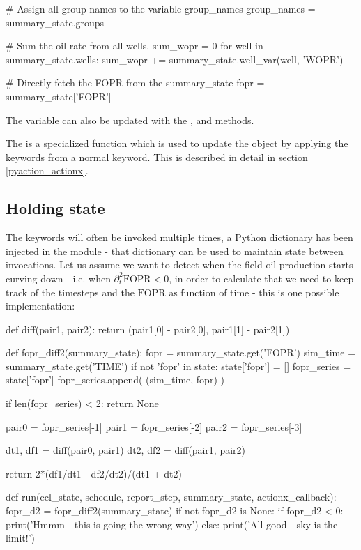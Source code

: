 \begin{description}
\begin{code}
    # Assign all group names to the variable group_names
    group_names = summary_state.groups

    # Sum the oil rate from all wells.
    sum_wopr = 0
    for well in summary_state.wells:
        sum_wopr += summary_state.well_var(well, 'WOPR')

    # Directly fetch the FOPR from the summary_state
    fopr = summary_state['FOPR']
  \end{code}
  The  variable can also be updated with the
  ,  and
   methods.
\item[\inlinecode{actionx\_callback}:] The  is a
  specialized function which is used to update the  object
  by applying the keywords from a normal \actionx{} keyword. This is described
  in detail in section \ref{pyaction_actionx}.
\end{description}

\subsection{Holding state}
The \pyaction{} keywords will often be invoked multiple times, a Python
dictionary  has been injected in the module - that dictionary
can be used to maintain state between invocations. Let us assume we want to
detect when the field oil production starts curving down - i.e. when
$\partial^2_{t} \mathrm{FOPR} < 0$, in order to calculate that we need to keep
track of the timesteps and the $\mathrm{FOPR}$ as function of time - this is one
possible implementation:
\begin{code}
def diff(pair1, pair2):
    return (pair1[0] - pair2[0], pair1[1] - pair2[1])

def fopr_diff2(summary_state):
    fopr = summary_state.get('FOPR')
    sim_time = summary_state.get('TIME')
    if not 'fopr' in state:
        state['fopr'] = []
    fopr_series = state['fopr']
    fopr_series.append( (sim_time, fopr) )

    if len(fopr_series) < 2:
       return None

    pair0 = fopr_series[-1]
    pair1 = fopr_series[-2]
    pair2 = fopr_series[-3]

    dt1, df1 = diff(pair0, pair1)
    dt2, df2 = diff(pair1, pair2)

    return 2*(df1/dt1 - df2/dt2)/(dt1 + dt2)

def run(ecl_state, schedule, report_step, summary_state, actionx_callback):
    fopr_d2 = fopr_diff2(summary_state)
    if not fopr_d2 is None:
       if fopr_d2 < 0:
           print('Hmmm - this is going the wrong way')
       else:
           print('All good - sky is the limit!')
\end{code}


